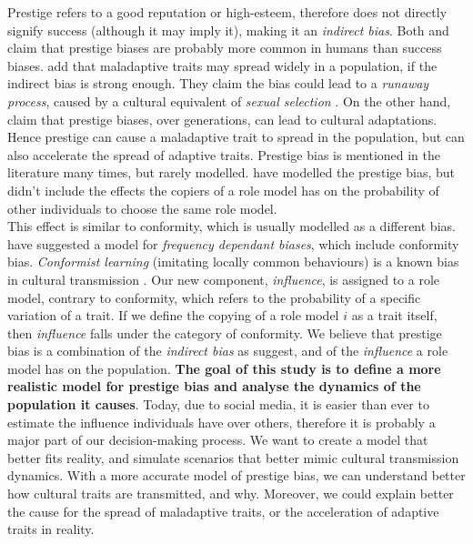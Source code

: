 \documentclass[11pt]{article}
\begin{document}
Prestige refers to a good reputation or high-esteem, therefore does not directly signify success (although it may imply it), making it an \textit{indirect bias}. %
Both \citet[Ch. 8]{evolutionBook} and \citet{complexityPaper} claim that prestige biases are probably more common in humans than success biases. %
\citet[Ch. 8]{evolutionBook} add that maladaptive traits may spread widely in a population, if the indirect bias is strong enough. %
They claim the bias could lead to a \textit{runaway process}, caused by a cultural equivalent of \textit{sexual selection} \citep{sexualSelectionBook}.
On the other hand, \citet{henrichBroesch} claim that prestige biases, over generations, can lead to cultural adaptations. %
Hence prestige can cause a maladaptive trait to spread in the population, but can also accelerate the spread of adaptive traits. %
Prestige bias is mentioned in the literature many times, but rarely modelled. %
\citet{evolutionBook} have modelled the prestige bias, but didn't include the effects the copiers of a role model has on the probability of other individuals to choose the same role model.\\ %
This effect is similar to conformity, which is usually modelled as a different bias.
\citet{evolutionBook} have suggested a model for \textit{frequency dependant biases}, which include conformity bias.
\textit{Conformist learning} (imitating locally common behaviours) is a known bias in cultural transmission \citep{conformism}.
Our new component, \textit{influence}, is assigned to a role model, contrary to conformity, which refers to the probability of a specific variation of a trait.
If we define the copying of a role model $i$ as a trait itself, then \textit{influence} falls under the category of conformity.
We believe that prestige bias is a combination of the \textit{indirect bias} as \citet{evolutionBook} suggest, and of the \textit{influence} a role model has on the population.
\textbf{The goal of this study is to define a more realistic model for prestige bias and analyse the dynamics of the population it causes}. %
Today, due to social media, it is easier than ever to estimate the influence individuals have over others, therefore it is probably a major part of our decision-making process.  
We want to create a model that better fits reality, and simulate scenarios that better mimic cultural transmission dynamics.
With a more accurate model of prestige bias, we can understand better how cultural traits are transmitted, and why.
Moreover, we could explain better the cause for the spread of maladaptive traits, or the acceleration of adaptive traits in reality.
\end{document}
